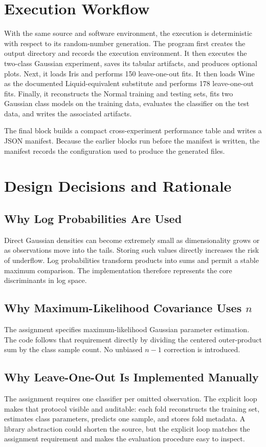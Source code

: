 \documentclass[11pt,a4paper]{article}
\begin{document}
\section{Execution Workflow}
With the same source and software environment, the execution is deterministic with respect to its random-number generation. The program first creates the output directory and records the execution environment. It then executes the two-class Gaussian experiment, saves its tabular artifacts, and produces optional plots. Next, it loads Iris and performs 150 leave-one-out fits. It then loads Wine as the documented Liquid-equivalent substitute and performs 178 leave-one-out fits. Finally, it reconstructs the Normal training and testing sets, fits two Gaussian class models on the training data, evaluates the classifier on the test data, and writes the associated artifacts.

The final block builds a compact cross-experiment performance table and writes a JSON manifest. Because the earlier blocks run before the manifest is written, the manifest records the configuration used to produce the generated files.

\section{Design Decisions and Rationale}

\subsection{Why Log Probabilities Are Used}
Direct Gaussian densities can become extremely small as dimensionality grows or as observations move into the tails. Storing such values directly increases the risk of underflow. Log probabilities transform products into sums and permit a stable maximum comparison. The implementation therefore represents the core discriminants in log space.

\subsection{Why Maximum-Likelihood Covariance Uses $n$}
The assignment specifies maximum-likelihood Gaussian parameter estimation. The code follows that requirement directly by dividing the centered outer-product sum by the class sample count. No unbiased $n-1$ correction is introduced.

\subsection{Why Leave-One-Out Is Implemented Manually}
The assignment requires one classifier per omitted observation. The explicit loop makes that protocol visible and auditable: each fold reconstructs the training set, estimates class parameters, predicts one sample, and stores fold metadata. A library abstraction could shorten the source, but the explicit loop matches the assignment requirement and makes the evaluation procedure easy to inspect.
\end{document}
